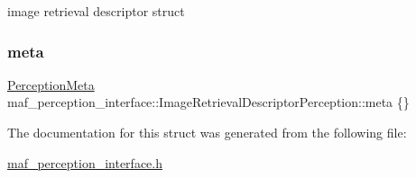 image retrieval descriptor struct 

\mbox{\label{structmaf__perception__interface_1_1ImageRetrievalDescriptorPerception_ae2d87cc3549bad105892e80b7fd205b6}} 
\subsubsection{\texorpdfstring{meta}{meta}}
{\footnotesize\ttfamily \hyperlink{structmaf__perception__interface_1_1PerceptionMeta}{Perception\+Meta} maf\+\_\+perception\+\_\+interface\+::\+Image\+Retrieval\+Descriptor\+Perception\+::meta \{\}}



The documentation for this struct was generated from the following file\+:\begin{DoxyCompactItemize}
\item 
\hyperlink{maf__perception__interface_8h}{maf\+\_\+perception\+\_\+interface.\+h}\end{DoxyCompactItemize}
